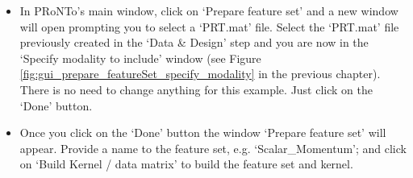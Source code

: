 \begin{itemize}

	\item In PRoNTo's main window, click on `Prepare feature set' and a new window will open prompting you to select a `PRT.mat' file. Select the `PRT.mat' file previously created in the `Data \& Design' step and you are now in the `Specify modality to include' window (see Figure \ref{fig:gui_prepare_featureSet_specify_modality} in the previous chapter). There is no need to change anything for this example. Just click on the `Done' button.
	
	\item Once you click on the `Done' button the window `Prepare feature set' will appear. Provide a name to the feature set, e.g. `Scalar\_Momentum'; and click on `Build Kernel / data matrix' to build the feature set and kernel.
	
\end{itemize}


